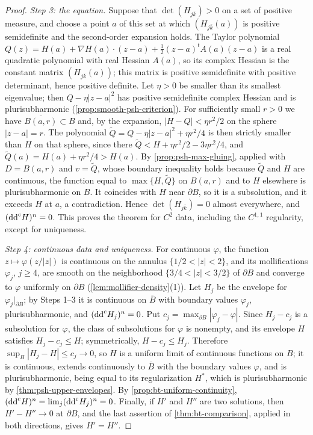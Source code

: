 \begin{proof}
\emph{Step 3: the equation.} Suppose that $\det(H_{j\bar k})>0$ on a set of positive measure, and choose a point $a$ of this set at which $(H_{j\bar k}(a))$ is positive semidefinite and the second-order expansion holds. The Taylor polynomial $Q(z)=H(a)+\nabla H(a)\cdot(z-a)+\frac12(z-a)^tA(a)(z-a)$ is a real quadratic polynomial with real Hessian $A(a)$, so its complex Hessian is the constant matrix $(H_{j\bar k}(a))$; this matrix is positive semidefinite with positive determinant, hence positive definite. Let $\eta>0$ be smaller than its smallest eigenvalue; then $Q-\eta|z-a|^2$ has positive semidefinite complex Hessian and is plurisubharmonic (\cref{prop:smooth-psh-criterion}). For sufficiently small $r>0$ we have $\overline{B(a,r)}\subset B$ and, by the expansion, $|H-Q|<\eta r^2/2$ on the sphere $|z-a|=r$. The polynomial $\tilde Q=Q-\eta|z-a|^2+\eta r^2/4$ is then strictly smaller than $H$ on that sphere, since there $\tilde Q<H+\eta r^2/2-3\eta r^2/4$, and $\tilde Q(a)=H(a)+\eta r^2/4>H(a)$. By \cref{prop:psh-max-gluing}, applied with $D=B(a,r)$ and $v=\tilde Q$, whose boundary inequality holds because $\tilde Q$ and $H$ are continuous, the function equal to $\max\{H,\tilde Q\}$ on $B(a,r)$ and to $H$ elsewhere is plurisubharmonic on $B$. It coincides with $H$ near $\partial B$, so it is a subsolution, and it exceeds $H$ at $a$, a contradiction. Hence $\det(H_{j\bar k})=0$ almost everywhere, and $(\mathrm{dd}^{\mathrm{c}} H)^n=0$. This proves the theorem for $C^2$ data, including the $C^{1,1}$ regularity, except for uniqueness.

\emph{Step 4: continuous data and uniqueness.} For continuous $\varphi$, the function $z\mapsto\varphi(z/|z|)$ is continuous on the annulus $\{1/2<|z|<2\}$, and its mollifications $\varphi_j$, $j\ge4$, are smooth on the neighborhood $\{3/4<|z|<3/2\}$ of $\partial B$ and converge to $\varphi$ uniformly on $\partial B$ (\cref{lem:mollifier-density}(1)). Let $H_j$ be the envelope for $\varphi_j|_{\partial B}$; by Steps 1--3 it is continuous on $\overline B$ with boundary values $\varphi_j$, plurisubharmonic, and $(\mathrm{dd}^{\mathrm{c}} H_j)^n=0$. Put $c_j=\max_{\partial B}|\varphi_j-\varphi|$. Since $H_j-c_j$ is a subsolution for $\varphi$, the class of subsolutions for $\varphi$ is nonempty, and its envelope $H$ satisfies $H_j-c_j\le H$; symmetrically, $H-c_j\le H_j$. Therefore $\sup_B|H_j-H|\le c_j\to0$, so $H$ is a uniform limit of continuous functions on $B$; it is continuous, extends continuously to $\overline B$ with the boundary values $\varphi$, and is plurisubharmonic, being equal to its regularization $H^*$, which is plurisubharmonic by \cref{thm:psh-upper-envelopes}. By \cref{prop:bt-uniform-continuity}, $(\mathrm{dd}^{\mathrm{c}} H)^n=\lim_j(\mathrm{dd}^{\mathrm{c}} H_j)^n=0$. Finally, if $H'$ and $H''$ are two solutions, then $H'-H''\to0$ at $\partial B$, and the last assertion of \cref{thm:bt-comparison}, applied in both directions, gives $H'=H''$.
\end{proof}

